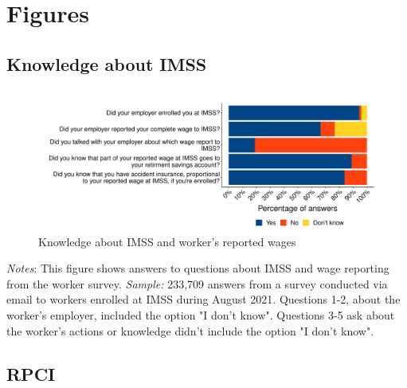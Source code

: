 \documentclass[oneside,11pt]{article}
\begin{document}
\clearpage


\singlespacing

\section{Figures}

\subsection{Knowledge about IMSS}

\vspace{.7in}
\begin{figure}[H]
    \centering
    \caption{Knowledge about IMSS and worker's reported wages \label{fig:hist_knowledge_register_survey}}
    \includegraphics[width=\textwidth]{04_Figures/worker_survey/hist_knowledge_register_survey.pdf}
\end{figure}
\scriptsize{\textit{Notes}: This figure shows answers to questions about IMSS and wage reporting from the worker survey. \textit{Sample:} 233,709 answers from a survey conducted via email to workers enrolled at IMSS during August 2021. Questions 1-2, about the worker's employer, included the option "I don't know". Questions 3-5 ask about the worker's actions or knowledge didn't include the option "I don't know".}

\clearpage

\subsection{RPCI}
\end{document}
